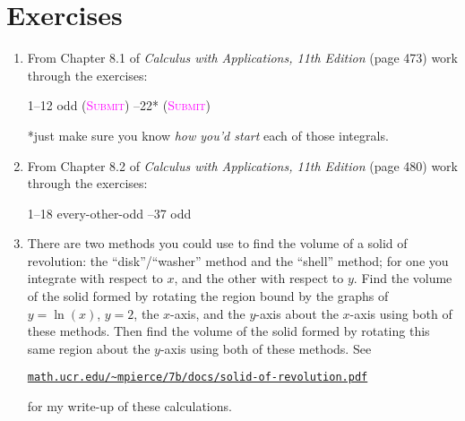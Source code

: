 \newpage

\section*{Exercises}

\begin{enumerate}
    \item %
        From Chapter 8.1 of \emph{Calculus with Applications, 11th Edition}
        (page 473) work through the exercises:
        \begin{center}
            1--12 odd
            (\textsc{\textcolor{magenta}{Submit}})
            --22*
            (\textsc{\textcolor{magenta}{Submit}})
        \end{center}
        *just make sure you know \emph{how you'd start} 
        each of those integrals.

    \item %
        From Chapter 8.2 of \emph{Calculus with Applications, 11th Edition}
        (page 480) work through the exercises:
        \begin{center}
            1--18 every-other-odd
            --37 odd
        \end{center}

    \item \label{ex:methods}
        There are two methods you could use 
        to find the volume of a solid of revolution:
        the ``disk''/``washer'' method and the ``shell'' method;
        for one you integrate with respect to $x$, 
        and the other with respect to $y$.
        Find the volume of the solid formed by rotating the region bound by 
        the graphs of $y = \ln(x)$, $y=2$, the $x$-axis, and the $y$-axis
        about the $x$-axis using both of these methods. 
        Then find the volume of the solid formed by rotating this same region
        about the $y$-axis using both of these methods.
        See 
        \begin{center}
            \footnotesize
            \href{https://math.ucr.edu/~mpierce/teaching/biocalc-integral/docs/solid-of-revolution.pdf}%
            {\texttt{math.ucr.edu/\textasciitilde{}mpierce/7b/docs/solid-of-revolution.pdf}}
        \end{center}
        for my write-up of these calculations.


\end{enumerate}

